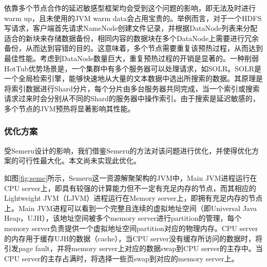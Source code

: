 \documentclass[lang=cn,12pt,a4paper,cite=authoryear]{elegantpaper}
\begin{document}
\begin{figure*}[!htp]
\begin{figure*}[!htp]
依靠多个节点合作的延迟敏感型框架均会受到这个问题的影响，即无法及时进行warm up，且未使用的JVM warm data会占用宝贵的。举例而言，对于一个HDFS写请求，客户端首先请求NameNode创建文件记录，并根据DataNode列表来分配适合的新块来存储数据备份，相同内容的数据块在多个DataNode上需要进行冗余备份，从而达到容错的目的。这意味着，多个节点需要重复该预热过程，从而达到最佳性能。考虑到DataNode数量巨大，重复预热过程的开销是显著的。一种削弱HotTub优势场景是，一个集群中有多个服务器可以处理请求，如SOLR\cite{DBLP:journals/ercim/Brouwer17}。SOLR是一个全局检索引擎，能够快速地从大量的文本数据中选出所搜索的数据。其原理是将索引数据进行Shard分片，每个分片由多台服务器共同完成，当一个索引或搜索请求过来时会分别从不同的Shard的服务器中操作索引。由于搜索是延迟敏感的，多个节点的JVM预热将显著影响其性能。

\subsubsection{优化方案}
受Semeru设计的影响，我们借鉴Semeru的方法对该问题进行优化，并使得优化方案的可行性最大化。本文尚未实现此优化。

如图\ref{fig:seme}所示，Semeru这一资源解聚架构的JVM中，Main JVM进程运行在CPU server上，即具有较强的计算能力但不一定有充足内存的节点，而其相应的Lightweight JVM（LJVM）进程运行在Memory server上，即拥有充足内存的节点上。Main JVM进程可以看到一个完整且连续的虚拟地址空间（即Universal Java Heap，UJH），该地址空间被多个memory server进行partition的管理，每个memory server负责提供一个虚拟地址空间partition对应的物理内存。CPU server的内存用于缓存UJH的数据（cache），当CPU server没有缓存所访问的数据时，将引发page fault，并将memory server上对应的数据swap到CPU server的主存中。当CPU server的主存占满时，将选择一些页swap到对应的memory server上。

\end{figure*}
\end{figure*}
\end{document}
